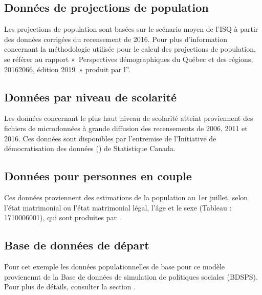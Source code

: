 \documentclass[letterpaper,10pt,french]{sphinxmanual}
\begin{document}
\subsection{Données de projections de population}
\label{\detokenize{resultats:donnees-de-projections-de-population}}
Les projections de population sont basées sur le scénario moyen de l’ISQ à partir des données corrigées du recensement de 2016. Pour plus d’information concernant la méthodologie utilisée pour le calcul des projections de population, se référer au rapport « Perspectives démographiques du Québec et des régions, 2016\sphinxhyphen{}2066, édition 2019 » produit par l”.


\subsection{Données par niveau de scolarité}
\label{\detokenize{resultats:donnees-par-niveau-de-scolarite}}
Les données concernant le plus haut niveau de scolarité atteint proviennent des fichiers de microdonnées à grande diffusion des recensements de 2006, 2011 et 2016. Ces données sont disponibles par l’entremise de l’Initiative de démocratisation des données () de Statistique Canada.


\subsection{Données pour personnes en couple}
\label{\detokenize{resultats:donnees-pour-personnes-en-couple}}
Ces données proviennent des estimations de la population au 1er juillet, selon l’état matrimonial ou l’état matrimonial légal, l’âge et le sexe (Tableau : 17\sphinxhyphen{}10\sphinxhyphen{}0060\sphinxhyphen{}01), qui sont produites par .


\subsection{Base de données de départ}
\label{\detokenize{resultats:base-de-donnees-de-depart}}
Pour cet exemple les données populationnelles de base pour ce modèle provienennt de la Base de données de simulation de politiques sociales (BDSPS).
Pour plus de détails, consulter la section {\hyperref[\detokenize{import:import}]{}}.
\end{document}
